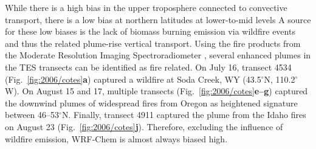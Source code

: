 While there is a high bias in the upper troposphere connected to convective transport, there is a low bias at northern latitudes at lower-to-mid levels
A source for these low biases is the lack of biomass burning emission via wildfire events and thus the related plume-rise vertical transport. Using the fire products from
the Moderate Resolution Imaging Spectroradiometer \citep[MODIS;][]{Justice:2002zr}, several enhanced  plumes in the TES transects can be identified as fire
related. On July 16, transect 4534 (Fig.~\ref{fig:2006/cotes}{\bf a}) captured a wildfire at Soda Creek, WY (43.5$^\circ$N, 110.2$^\circ$W). On August 15 and 17, multiple
transects (Fig.~\ref{fig:2006/cotes}{\bf e--g}) captured the downwind plumes of widespread fires from Oregon as heightened  signature between 46--53$^\circ$N.
Finally, transect 4911 captured the plume from the Idaho fires on August 23 (Fig.~\ref{fig:2006/cotes}{\bf j}). Therefore, excluding the influence of wildfire emission,
WRF-Chem is almost always biased high.

